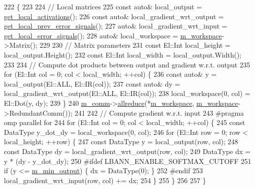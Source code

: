 \begin{DoxyCode}
222                                 \{
223 
224     \textcolor{comment}{// Local matrices}
225     \textcolor{keyword}{const} \textcolor{keyword}{auto}& local\_output = \hyperlink{classlbann_1_1Layer_a4248f27acebf72b7b7b3ee39c8bcb62a}{get\_local\_activations}();
226     \textcolor{keyword}{const} \textcolor{keyword}{auto}& local\_gradient\_wrt\_output = \hyperlink{classlbann_1_1Layer_a82827edc5e869960144f3ccb2172bfcd}{get\_local\_prev\_error\_signals}();
227     \textcolor{keyword}{auto}& local\_gradient\_wrt\_input = \hyperlink{classlbann_1_1Layer_af178d00b9d878aa7d87754bff2a91f3a}{get\_local\_error\_signals}();
228     \textcolor{keyword}{auto}& local\_workspace = \hyperlink{classlbann_1_1softmax__layer_a604e614de25758f0072308c7efdd5bdb}{m\_workspace}->Matrix();
229     
230     \textcolor{comment}{// Matrix parameters}
231     \textcolor{keyword}{const} El::Int local\_height = local\_output.Height();
232     \textcolor{keyword}{const} El::Int local\_width = local\_output.Width();
233 
234     \textcolor{comment}{// Compute dot products between output and gradient w.r.t. output}
235     \textcolor{keywordflow}{for} (El::Int col = 0; col < local\_width; ++col) \{
236       \textcolor{keyword}{const} \textcolor{keyword}{auto}& y = local\_output(El::ALL, El::IR(col));
237       \textcolor{keyword}{const} \textcolor{keyword}{auto}& dy = local\_gradient\_wrt\_output(El::ALL, El::IR(col));
238       local\_workspace(0, col) = El::Dot(y, dy);
239     \}
240     \hyperlink{classlbann_1_1Layer_a5de05c52f22e0bbd7c703bec3ad4dbf2}{m\_comm}->\hyperlink{classlbann_1_1lbann__comm_af5631e5f0f54e4df4958eba9df2599ef}{allreduce}(*\hyperlink{classlbann_1_1softmax__layer_a604e614de25758f0072308c7efdd5bdb}{m\_workspace}, \hyperlink{classlbann_1_1softmax__layer_a604e614de25758f0072308c7efdd5bdb}{m\_workspace}->RedundantComm());
241 
242     \textcolor{comment}{// Compute gradient w.r.t. input}
243 \textcolor{preprocessor}{    #pragma omp parallel for}
244     \textcolor{keywordflow}{for} (El::Int col = 0; col < local\_width; ++col) \{
245       \textcolor{keyword}{const} DataType y\_dot\_dy = local\_workspace(0, col);
246       \textcolor{keywordflow}{for} (El::Int row = 0; row < local\_height; ++row) \{
247         \textcolor{keyword}{const} DataType y = local\_output(row, col);
248         \textcolor{keyword}{const} DataType dy = local\_gradient\_wrt\_output(row, col);
249         DataType dx = y * (dy - y\_dot\_dy);
250 \textcolor{preprocessor}{      #ifdef LBANN\_ENABLE\_SOFTMAX\_CUTOFF}
251         \textcolor{keywordflow}{if} (y <= \hyperlink{classlbann_1_1softmax__layer_ab3bf2d92f4441923dd0b792c38ec774a}{m\_min\_output}) \{ dx = DataType(0); \}
252 \textcolor{preprocessor}{      #endif}
253         local\_gradient\_wrt\_input(row, col) += dx;
254       \}
255     \}
256   
257   \}
\end{DoxyCode}
\mbox{\label{classlbann_1_1softmax__layer_a507c8c53b4a1bc20b6e5b70ce05d7f67}} 

